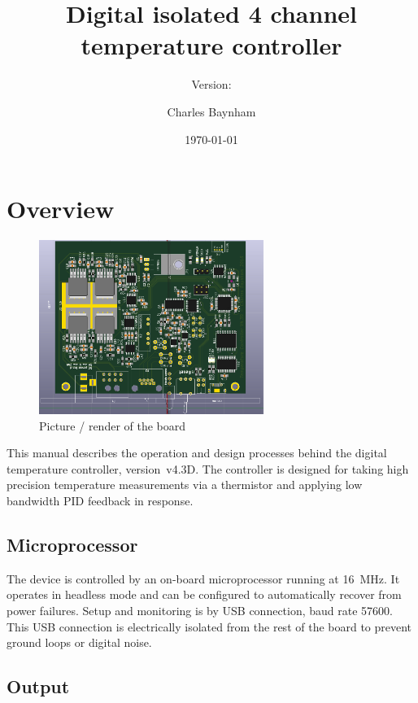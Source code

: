 \documentclass[11pt]{report}
\title{Digital isolated 4 channel temperature controller}
\subtitle{Version: \tempCtrlVer}
\author{Charles Baynham}
\date{\today}                                           %
\newcommand{\tempCtrlVer}{v4.3D}
\begin{document}
\maketitle

\tableofcontents
\clearpage

\chapter{Overview} %
\label{sec:overview}

\begin{figure}[h]
	\centering
	\includegraphics[width=0.65\textwidth]{BoardRender}
	\caption{Picture / render of the board}
	\label{fig:wholeboard}
\end{figure}

This manual describes the operation and design processes behind the  digital temperature controller, version~\tempCtrlVer. The controller is designed for taking high precision temperature measurements via a thermistor and applying low bandwidth PID feedback in response.

\section{Microprocessor}

The device is controlled by an on-board microprocessor running at \SI{16}{MHz}. It operates in headless mode and can be configured to automatically recover from power failures. Setup and monitoring is by USB connection, baud rate 57600. This USB connection is electrically isolated from the rest of the board to prevent ground loops or digital noise. 

\section{Output}
\end{document}
